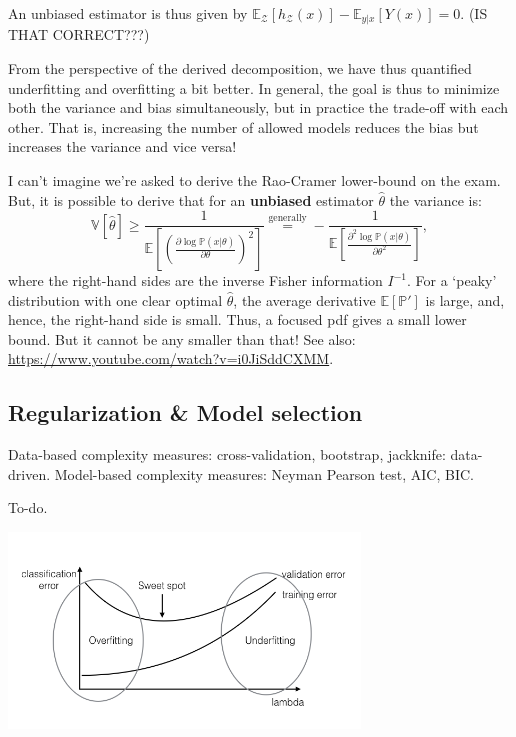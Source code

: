 \documentclass{article}
\begin{document}
An unbiased estimator is thus given by $\mathbb{E}_{\mathcal{Z}}[h_\mathcal{Z}(x)]-\mathbb{E}_{y|x}[Y(x)]=0$. (IS THAT CORRECT???)

From the perspective of the derived decomposition, we have thus quantified underfitting and overfitting a bit better. In general, the goal is thus to minimize both the variance and bias simultaneously, but in practice the trade-off with each other. That is, increasing the number of allowed models reduces the bias but increases the variance and vice versa!

\begin{spexample}
    I can't imagine we're asked to derive the Rao-Cramer lower-bound on the exam. But, it is possible to derive that for an \textbf{unbiased} estimator $\hat{\theta}$ the variance is:
    \begin{equation}
        \mathbb{V}[\hat{\theta}] \geq \frac{1}{\mathbb{E}\left[\left(\frac{\partial \log\mathbb{P}(x|\theta)}{\partial\theta}\right)^2\right]} \stackrel{\text{generally}}{=} -\frac{1}{\mathbb{E}\left[ \frac{\partial^2\log \mathbb{P}(x|\theta)}{\partial\theta^2}   \right]},
    \end{equation}
    where the right-hand sides are the inverse Fisher information $I^{-1}$. For a `peaky' distribution with one clear optimal $\hat{\theta}$, the average derivative $\mathbb{E}[\mathbb{P}']$ is large, and, hence, the right-hand side is small. Thus, a focused pdf gives a small lower bound. But it cannot be any smaller than that! See also: \url{https://www.youtube.com/watch?v=i0JiSddCXMM}.
\end{spexample}

\subsection{Regularization \& Model selection}
Data-based complexity measures: cross-validation, bootstrap, jackknife: data-driven. Model-based complexity measures: Neyman Pearson test, AIC, BIC.

To-do.


\includegraphics[width=0.7\textwidth]{underoverfit.png}
\end{document}
